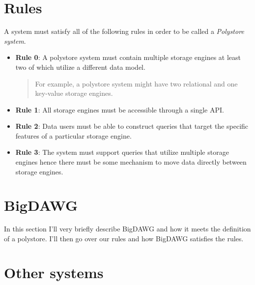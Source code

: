 \documentclass[conference]{IEEEtran}
\newcommand{\term}[1]{\emph{#1}}
\begin{document}
\section{Rules}

%
%

A system must satisfy all of the following rules in order
to be called a \term{Polystore system}.
\begin{itemize}

\item {\bf Rule 0}: 
A polystore system must contain multiple storage engines 
at least two of which utilize a different data model.
\begin{quote}
For example, a polystore system might have two relational
and one key-value storage engines.
\end{quote}

\item {\bf Rule 1}: 
All storage engines must be accessible through a single API. 

\item {\bf Rule 2}: 
Data users must be able to construct queries that target the 
specific features of a particular storage engine.

\item {\bf Rule 3}: 
The system must support queries that utilize multiple storage engines 
hence there must be some mechanism to move data directly between 
storage engines. 

\end{itemize}

\section{BigDAWG}

In this section I'll very briefly describe BigDAWG and how it meets
the definition of a polystore. I'll then go over our rules and how
BigDAWG satisfies the rules.

\section{Other systems}
\end{document}
